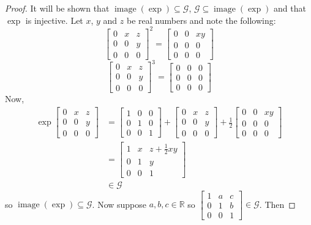 \documentclass[honours]{UNSWthesis}
\newcommand{\R}{\mathbb{R}}
\newcommand{\G}{\mathcal{G}}
\newcommand{\1}{\mathbf{e}_{1}}
\newcommand{\2}{\mathbf{e}_{3}}
\newcommand{\3}{\mathbf{e}_{3}}
\DeclareMathOperator{\image}{image}
\begin{document}
\begin{proof}
It will be shown that $\image(\exp) \subseteq \G$, $\G \subseteq \image(\exp)$ and that $\exp$ is injective. 
Let $x$, $y$ and $z$ be real numbers and note the following: 
\[
\begin{bmatrix} 0 & x & z \\ 0 & 0 & y \\ 0 & 0 & 0 \end{bmatrix}^2=\begin{bmatrix} 0 & 0 & xy \\ 0 & 0 & 0 \\ 0 & 0 & 0 \end{bmatrix}
\]
\[
\begin{bmatrix} 0 & x & z \\ 0 & 0 & y \\ 0 & 0 & 0 \end{bmatrix}^3=\begin{bmatrix} 0 & 0 & 0 \\ 0 & 0 & 0 \\ 0 & 0 & 0 \end{bmatrix}
\]
Now,
\begin{align*}
 \exp \begin{bmatrix} 0 & x & z \\ 0 & 0 & y \\ 0 & 0 & 0 \end{bmatrix} &= \begin{bmatrix} 1 & 0 & 0 \\ 0 & 1 & 0 \\ 0 & 0 & 1 \end{bmatrix} + \begin{bmatrix} 0 & x & z \\ 0 & 0 & y \\ 0 & 0 & 0 \end{bmatrix}+ \frac{1}{2}\begin{bmatrix} 0 & 0 & xy \\ 0 & 0 & 0 \\ 0 & 0 & 0 \end{bmatrix} \\[.7em]
&= \begin{bmatrix} 1 & x & z+\frac{1}{2}xy \\ 0 & 1 & y \\ 0 & 0 & 1 \end{bmatrix} \\[.7em]
&\in  \G
\end{align*} so $ \image(\exp) \subseteq \G$.
Now suppose $a,b,c \in \R$ so $\begin{bmatrix} 1 & a & c \\ 0 & 1 & b \\ 0 & 0 & 1 \end{bmatrix} \in \G$. Then 

\end{proof}
\end{document}
